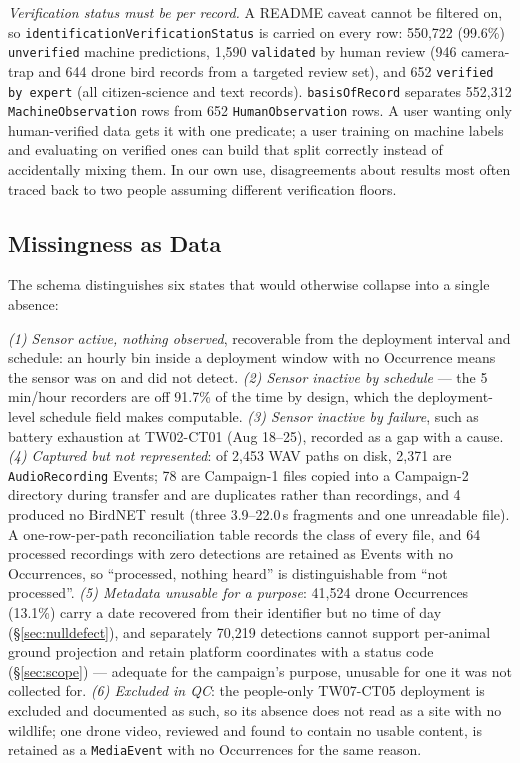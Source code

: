 \documentclass[sigconf]{acmart}
\begin{document}
\emph{Verification status must be per record.} A README caveat cannot be
filtered on, so \texttt{identification\allowbreak Verification\allowbreak Status} is carried on
every row: 550{,}722 (99.6\%) \texttt{unverified} machine predictions,
1{,}590 \texttt{validated} by human review (946 camera-trap and 644
drone bird records from a targeted review set), and 652
\texttt{verified by expert} (all citizen-science and text records).
\texttt{basisOfRecord} separates 552{,}312 \texttt{MachineObservation}
rows from 652 \texttt{HumanObservation} rows. A user wanting only
human-verified data gets it with one predicate; a user training on
machine labels and evaluating on verified ones can build that split
correctly instead of accidentally mixing them. In our own use, disagreements about
results most often traced back to two people assuming different
verification floors.

\subsection{Missingness as Data}

The schema distinguishes six states that would otherwise collapse into a
single absence:

\emph{(1) Sensor active, nothing observed}, recoverable from the
deployment interval and schedule: an hourly bin inside a deployment
window with no Occurrence means the sensor was on and did not detect.
\emph{(2) Sensor inactive by schedule} --- the 5\,min/hour recorders are
off 91.7\% of the time by design, which the deployment-level schedule
field makes computable. \emph{(3) Sensor inactive by failure}, such as
battery exhaustion at TW02-CT01 (Aug 18--25), recorded as a gap with a
cause. \emph{(4) Captured but not represented}: of 2{,}453 WAV paths on
disk, 2{,}371 are \texttt{AudioRecording} Events; 78 are Campaign-1
files copied into a Campaign-2 directory during transfer and are
duplicates rather than recordings, and 4 produced no BirdNET result
(three 3.9--22.0\,s fragments and one unreadable file). A one-row-per-path
reconciliation table records the class of every file, and 64 processed
recordings with zero detections are retained as Events with no
Occurrences, so ``processed, nothing heard'' is distinguishable from
``not processed''.
\emph{(5) Metadata unusable for a purpose}: 41{,}524 drone Occurrences
(13.1\%) carry a date recovered from their identifier but no time of
day (\S\ref{sec:nulldefect}), and separately
70{,}219 detections cannot support per-animal ground projection and
retain platform coordinates with a status code (\S\ref{sec:scope}) ---
adequate for the campaign's purpose, unusable for one it was not
collected for. \emph{(6) Excluded in QC}: the people-only TW07-CT05
deployment is excluded and documented as such, so its absence does not
read as a site with no wildlife; one drone video, reviewed and found to
contain no usable content, is retained as a \texttt{MediaEvent} with no
Occurrences for the same reason.
\end{document}
